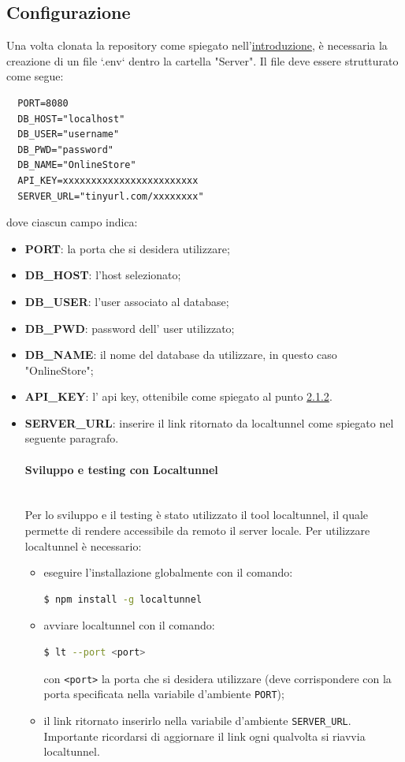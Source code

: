 \documentclass[a4paper, 12pt]{article}
\begin{document}
\subsection{Configurazione}
\label{sec:config_server}
Una volta clonata la repository come spiegato nell'\hyperref[sec:intro]{introduzione}, è necessaria la creazione di un file `.env` dentro la cartella "Server". Il file deve essere strutturato come segue:
\begin{verbatim}
  PORT=8080
  DB_HOST="localhost"
  DB_USER="username"
  DB_PWD="password"
  DB_NAME="OnlineStore"
  API_KEY=xxxxxxxxxxxxxxxxxxxxxxxx
  SERVER_URL="tinyurl.com/xxxxxxxx"
\end{verbatim}
dove ciascun campo indica:
\begin{itemize}
  \item \textbf{PORT}: la porta che si desidera utilizzare;
  \item \textbf{DB\_HOST}: l'host selezionato;
  \item \textbf{DB\_USER}: l'user associato al database;
  \item \textbf{DB\_PWD}: password dell' user utilizzato;
  \item \textbf{DB\_NAME}: il nome del database da utilizzare, in questo caso "OnlineStore";
  \item \textbf{API\_KEY}: l' api key, ottenibile come spiegato al punto \hyperref[sec:provider]{2.1.2}.
  \mbox{}
  \item \textbf{SERVER\_URL}: inserire il link ritornato da localtunnel come spiegato nel seguente paragrafo.\\
  \paragraph{Sviluppo e testing con Localtunnel}\\
  Per lo sviluppo e il testing è stato utilizzato il tool localtunnel, il quale permette di rendere accessibile da remoto il server locale. Per utilizzare localtunnel è necessario:
  \begin{itemize}
    \item eseguire l'installazione globalmente con il comando:
    \begin{lstlisting}[language=bash]
      $ npm install -g localtunnel
    \end{lstlisting}
    \item avviare localtunnel con il comando:
    \begin{lstlisting}[language=bash]
      $ lt --port <port>
    \end{lstlisting}
    con \verb|<port>| la porta che si desidera utilizzare (deve corrispondere con la porta specificata nella variabile d'ambiente \verb|PORT|);\\
    \item il link ritornato inserirlo nella variabile d'ambiente \verb|SERVER_URL|. Importante ricordarsi di aggiornare il link ogni qualvolta si riavvia localtunnel.
  \end{itemize}

\end{itemize}
\end{document}
